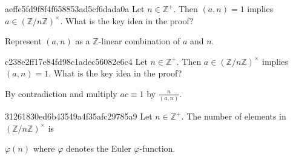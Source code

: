 \begin{note}{aeffe5fd9f8f4f658853ad5cf6dada0a}
    Let \({ n \in \mathbb Z^{+} }\).
    Then \({ (a, n) = 1 }\) implies \({ a \in (\mathbb Z / n\mathbb Z)^{\times} }\).
    What is the key idea in the proof?

    \begin{cloze}{1}
        Represent \({ (a, n) }\) as a \({ \mathbb Z }\)-linear combination of \({ a }\) and \({ n }\).
    \end{cloze}
\end{note}

\begin{note}{c238e2ff17e84fd98c1adec56082e6c4}
    Let \({ n \in \mathbb Z^{+} }\).
    Then \({ a \in (\mathbb Z / n\mathbb Z)^{\times} }\) implies \({ (a, n) = 1 }\).
    What is the key idea in the proof?

    \begin{cloze}{1}
        By contradiction and multiply \({ ac \equiv 1 }\) by \({ \frac{n}{(a, n)} }\).
    \end{cloze}
\end{note}

\begin{note}{31261830ed6b43549a4f35afc29785a9}
    Let \({ n \in \mathbb Z^{+} }\).
    The number of elements in \({ (\mathbb Z / n\mathbb Z)^{\times} }\) is \begin{icloze}{1}\({ \varphi(n) }\) where \({ \varphi }\) denotes the Euler \({ \varphi }\)-function.\end{icloze}
\end{note}


